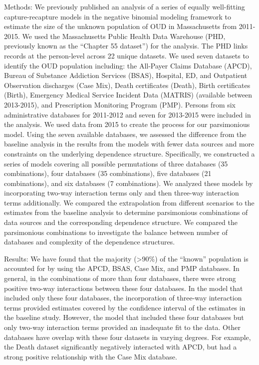 \begin{enumerate}
Methods: We previously published an analysis of a series of equally well-fitting capture-recapture models in the negative binomial modeling framework to estimate the size of the unknown population of OUD in Massachusetts from 2011-2015. We used the Massachusetts Public Health Data Warehouse (PHD, previously known as the “Chapter 55 dataset”) for the analysis. The PHD links records at the person-level across 22 unique datasets. We used seven datasets to identify the OUD population including: the All-Payer Claims Database (APCD), Bureau of Substance Addiction Services (BSAS), Hospital, ED, and Outpatient Observation discharges (Case Mix), Death certificates (Death), Birth certificates (Birth), Emergency Medical Service Incident Data (MATRIS) (available between 2013-2015), and Prescription Monitoring Program (PMP). Persons from six administrative databases for 2011-2012 and seven for 2013-2015 were included in the analysis. We used data from 2015 to create the process for our parsimonious model. Using the seven available databases, we assessed the difference from the baseline analysis in the results from the models with fewer data sources and more constraints on the underlying dependence structure. Specifically, we constructed a series of models covering all possible permutations of three databases (35 combinations), four databases (35 combinations), five databases (21 combinations), and six databases (7 combinations). We analyzed these models by incorporating two-way interaction terms only and then three-way interaction terms additionally. We compared the extrapolation from different scenarios to the estimates from the baseline analysis to determine parsimonious combinations of data sources and the corresponding dependence structure. We compared the parsimonious combinations to investigate the balance between number of databases and complexity of the dependence structures. 

Results: We have found that the majority (>90\%) of the “known” population is accounted for by using the APCD, BSAS, Case Mix, and PMP databases. In general, in the combinations of more than four databases, there were strong positive two-way interactions between these four databases. In the model that included only these four databases, the incorporation of three-way interaction terms provided estimates covered by the confidence interval of the estimates in the baseline study. However, the model that included these four databases but only two-way interaction terms provided an inadequate fit to the data. Other databases have overlap with these four datasets in varying degrees. For example, the Death dataset significantly negatively interacted with APCD, but had a strong positive relationship with the Case Mix database.


\end{enumerate}
